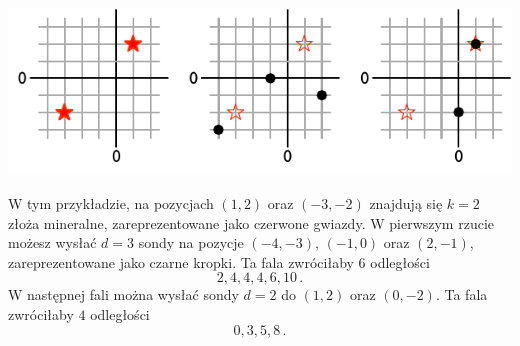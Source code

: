 \includegraphics[width=.6\textwidth]{img/sample1.pdf}

W tym przykładzie, na pozycjach $(1,2)$ oraz $(-3,-2)$ znajdują się $k=2$ złoża mineralne, zareprezentowane jako czerwone gwiazdy.
W pierwszym rzucie możesz wysłać $d=3$ sondy na pozycje $(-4,-3)$, $(-1, 0)$ oraz $(2,-1)$, zareprezentowane jako czarne kropki.
Ta fala zwróciłaby $6$ odległości \[
  2, 4, 4, 4, 6, 10\,.
\]
 W następnej fali można wysłać sondy $d=2$ do $(1,2)$ oraz $(0,-2)$.
Ta fala zwróciłaby $4$ odległości \[
  0, 3, 5, 8\,.
\]

